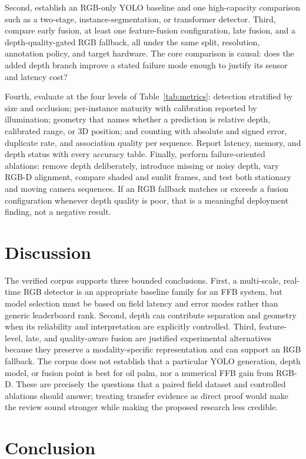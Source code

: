 Second, establish an RGB-only YOLO baseline and one high-capacity comparison such as a two-stage, instance-segmentation, or transformer detector. Third, compare early fusion, at least one feature-fusion configuration, late fusion, and a depth-quality-gated RGB fallback, all under the same split, resolution, annotation policy, and target hardware. The core comparison is causal: does the added depth branch improve a stated failure mode enough to justify its sensor and latency cost?

Fourth, evaluate at the four levels of Table~\ref{tab:metrics}: detection stratified by size and occlusion; per-instance maturity with calibration reported by illumination; geometry that names whether a prediction is relative depth, calibrated range, or 3D position; and counting with absolute and signed error, duplicate rate, and association quality per sequence. Report latency, memory, and depth status with every accuracy table. Finally, perform failure-oriented ablations: remove depth deliberately, introduce missing or noisy depth, vary RGB-D alignment, compare shaded and sunlit frames, and test both stationary and moving camera sequences. If an RGB fallback matches or exceeds a fusion configuration whenever depth quality is poor, that is a meaningful deployment finding, not a negative result.

\section{Discussion}

The verified corpus supports three bounded conclusions. First, a multi-scale, real-time RGB detector is an appropriate baseline family for an FFB system, but model selection must be based on field latency and error modes rather than generic leaderboard rank. Second, depth can contribute separation and geometry when its reliability and interpretation are explicitly controlled. Third, feature-level, late, and quality-aware fusion are justified experimental alternatives because they preserve a modality-specific representation and can support an RGB fallback. The corpus does not establish that a particular YOLO generation, depth model, or fusion point is best for oil palm, nor a numerical FFB gain from RGB-D. These are precisely the questions that a paired field dataset and controlled ablations should answer; treating transfer evidence as direct proof would make the review sound stronger while making the proposed research less credible.

\section{Conclusion}

